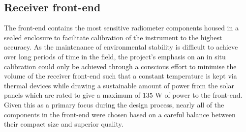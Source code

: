\subsection{Receiver front-end}
The front-end contains the most sensitive radiometer components housed in a sealed enclosure to facilitate calibration of the instrument to the highest accuracy. As the maintenance of environmental stability is difficult to achieve over long periods of time in the field, the project’s emphasis on an in situ calibration could only be achieved through a conscious effort to minimise the volume of the receiver front-end such that a constant temperature is kept via thermal devices while drawing a sustainable amount of power from the solar panels which are rated to give a maximum of 135 W of power to the front-end. Given this as a primary focus during the design process, nearly all of the components in the front-end were chosen based on a careful balance between their compact size and superior quality.


